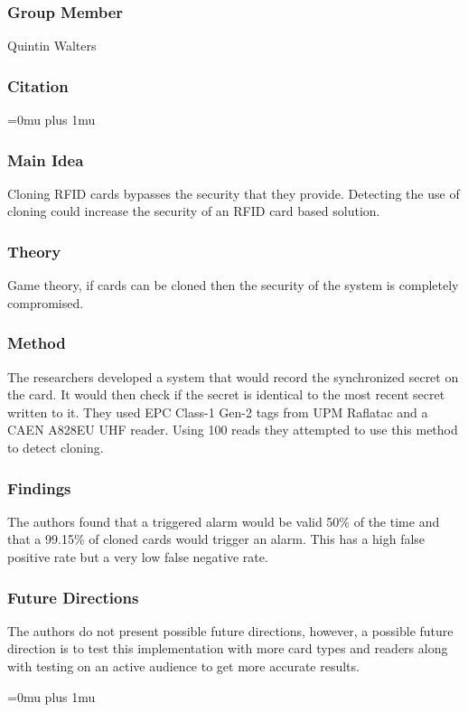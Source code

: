 \subsubsection{Group Member}

\noindent
Quintin Walters

\noindent
\subsubsection{Citation}

\Urlmuskip=0mu plus 1mu\relax

\subsubsection{Main Idea}

\noindent
Cloning RFID cards bypasses the security that they provide.  Detecting the use of cloning could increase the security of an RFID card based solution.

\subsubsection{Theory}

\noindent
Game theory, if cards can be cloned then the security of the system is completely compromised.

\subsubsection{Method}

\noindent
The researchers developed a system that would record the synchronized secret on the card.  It would then check if the secret is identical to the most recent secret written to it.  They used EPC Class-1 Gen-2 tags from UPM Raflatac and a CAEN A828EU UHF reader.  Using 100 reads they attempted to use this method to detect cloning.

\subsubsection{Findings}

\noindent
The authors found that a triggered alarm would be valid 50\% of the time and that a 99.15\% of cloned cards would trigger an alarm.  This has a high false positive rate but a very low false negative rate.

\subsubsection{Future Directions}

\noindent
The authors do not present possible future directions, however, a possible future direction is to test this implementation with more card types and readers along with testing on an active audience to get more accurate results. 

\Urlmuskip=0mu plus 1mu\relax
\pagebreak
